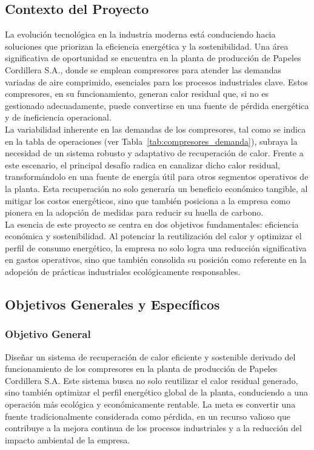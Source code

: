 \documentclass[11pt,a4paper]{article}  %
\begin{document}
\subsection{Contexto del Proyecto}
La evolución tecnológica en la industria moderna está conduciendo hacia soluciones que priorizan la eficiencia energética y la sostenibilidad. Una área significativa de oportunidad se encuentra en la planta de producción de Papeles Cordillera S.A., donde se emplean compresores para atender las demandas variadas de aire comprimido, esenciales para los procesos industriales clave. Estos compresores, en su funcionamiento, generan calor residual que, si no es gestionado adecuadamente, puede convertirse en una fuente de pérdida energética y de ineficiencia operacional.\\

La variabilidad inherente en las demandas de los compresores, tal como se indica en la tabla de operaciones (ver Tabla~\ref{tab:compresores_demanda}), subraya la necesidad de un sistema robusto y adaptativo de recuperación de calor. Frente a este escenario, el principal desafío radica en canalizar dicho calor residual, transformándolo en una fuente de energía útil para otros segmentos operativos de la planta. Esta recuperación no solo generaría un beneficio económico tangible, al mitigar los costos energéticos, sino que también posiciona a la empresa como pionera en la adopción de medidas para reducir su huella de carbono.\\

La esencia de este proyecto se centra en dos objetivos fundamentales: eficiencia económica y sostenibilidad. Al potenciar la reutilización del calor y optimizar el perfil de consumo energético, la empresa no solo logra una reducción significativa en gastos operativos, sino que también consolida su posición como referente en la adopción de prácticas industriales ecológicamente responsables.

\subsection{Objetivos Generales y Específicos}

\subsubsection{Objetivo General}
Diseñar un sistema de recuperación de calor eficiente y sostenible derivado del funcionamiento de los compresores en la planta de producción de Papeles Cordillera S.A. Este sistema busca no solo reutilizar el calor residual generado, sino también optimizar el perfil energético global de la planta, conduciendo a una operación más ecológica y económicamente rentable. La meta es convertir una fuente tradicionalmente considerada como pérdida, en un recurso valioso que contribuye a la mejora continua de los procesos industriales y a la reducción del impacto ambiental de la empresa.
\end{document}
